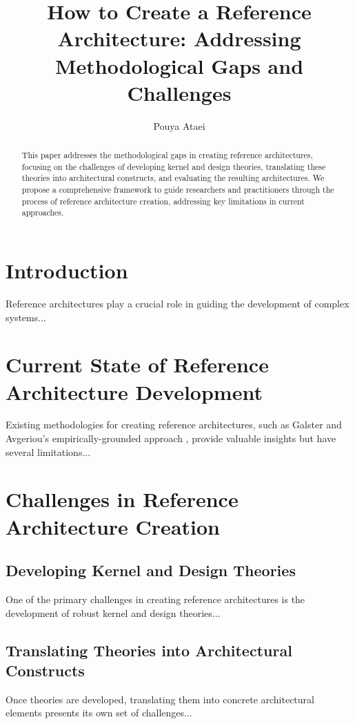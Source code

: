 \documentclass[12pt,a4paper]{article}
\title{How to Create a Reference Architecture: Addressing Methodological Gaps and Challenges}
\author{Pouya Ataei}
\date{}
\begin{document}
\maketitle

\begin{abstract}
This paper addresses the methodological gaps in creating reference architectures, focusing on the challenges of developing kernel and design theories, translating these theories into architectural constructs, and evaluating the resulting architectures. We propose a comprehensive framework to guide researchers and practitioners through the process of reference architecture creation, addressing key limitations in current approaches.
\end{abstract}

\section{Introduction}
\label{sec:introduction}
Reference architectures play a crucial role in guiding the development of complex systems...

\section{Current State of Reference Architecture Development}
\label{sec:current-state}
Existing methodologies for creating reference architectures, such as Galster and Avgeriou's empirically-grounded approach \citep{Galster2011}, provide valuable insights but have several limitations...

\section{Challenges in Reference Architecture Creation}
\label{sec:challenges}

\subsection{Developing Kernel and Design Theories}
\label{subsec:theories}
One of the primary challenges in creating reference architectures is the development of robust kernel and design theories...

\subsection{Translating Theories into Architectural Constructs}
\label{subsec:translation}
Once theories are developed, translating them into concrete architectural elements presents its own set of challenges...
\end{document}
